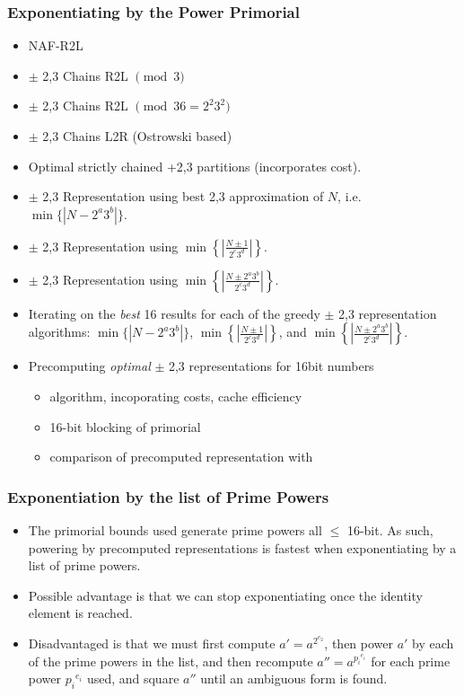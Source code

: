 \documentclass[11pt, letterpaper]{article}
\theoremstyle{definition}
\begin{document}
\subsubsection{Exponentiating by the Power Primorial}
\begin{itemize}
\item NAF-R2L
\item $\pm$ 2,3 Chains R2L $\pmod{3}$
\item $\pm$ 2,3 Chains R2L $\pmod{36=2^2 3^2}$
\item $\pm$ 2,3 Chains L2R (Ostrowski based)
\item Optimal strictly chained +2,3 partitions (incorporates cost).
\item $\pm$ 2,3 Representation using best 2,3 approximation of $N$, i.e. $\min \{|N-2^a3^b|\}$.
\item $\pm$ 2,3 Representation using $\min \left\{ \left| \frac{N \pm 1}{2^c3^d} \right| \right\}$.
\item $\pm$ 2,3 Representation using $\min \left\{ \left| \frac{N \pm 2^a3^b}{2^c3^d} \right| \right\}$.
\item Iterating on the \emph{best} 16 results for each of the greedy $\pm$ 2,3 representation algorithms: $\min \{|N-2^a3^b|\}$, $\min \left\{ \left| \frac{N \pm 1}{2^c3^d} \right| \right\}$, and $\min \left\{ \left| \frac{N \pm 2^a3^b}{2^c3^d} \right| \right\}$.
\item Precomputing \emph{optimal} $\pm$ 2,3 representations for 16bit numbers
	\begin{itemize}
	\item algorithm, incoporating costs, cache efficiency
	\item 16-bit blocking of primorial
	\item comparison of precomputed representation with 
	\end{itemize}
\end{itemize}

\subsubsection{Exponentiation by the list of Prime Powers}
\begin{itemize}
\item The primorial bounds used generate prime powers all $\le$ 16-bit.  As such, powering by precomputed representations is fastest when exponentiating by a list of prime powers.
\item Possible advantage is that we can stop exponentiating once the identity element is reached.
\item Disadvantaged is that we must first compute $a' = a^{2^{e_2}}$, then power $a'$ by each of the prime powers in the list, and then recompute $a'' = a^{{p_i}^{e_i}}$ for each prime power ${p_i}^{e_i}$ used, and square $a''$ until an ambiguous form is found.
\end{itemize}
\end{document}

